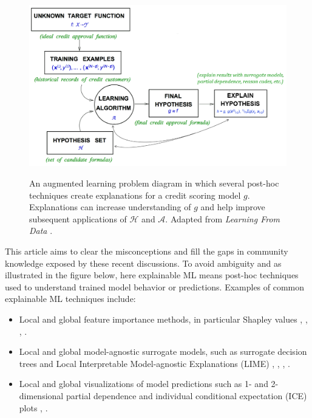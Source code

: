 \documentclass{article}
\begin{document}
\begin{figure}[htb]
	\begin{center}
		\includegraphics[scale=0.33]{img/figure_1.png}
		\label{fig:learning_problem}
		\caption{An augmented learning problem diagram in which several post-hoc techniques create explanations for a credit scoring model $g$. Explanations can increase understanding of $g$ and help improve subsequent applications of $\mathcal{H}$ and $\mathcal{A}$. Adapted from \textit{Learning From Data} \cite{lfd}.}
	\end{center}
\end{figure}	

This article aims to clear the misconceptions and fill the gaps in community knowledge exposed by these recent discussions. To avoid ambiguity and as illustrated in the figure below, here explainable ML means post-hoc techniques used to understand trained model behavior or predictions. Examples of common explainable ML techniques include:

\begin{itemize}
\item Local and global feature importance methods, in particular Shapley values \cite{shapley1988shapley}, \cite{keinan2004fair}, \cite{kononenko2010efficient}, \cite{shapley}.
\item Local and global model-agnostic surrogate models, such as surrogate decision trees and Local Interpretable Model-agnostic Explanations (LIME) \cite{dt_surrogate1}, \cite{dt_surrogate2}, \cite{lime-sup}, \cite{lime}. 
\item Local and global visualizations of model predictions such as 1- and 2-dimensional partial dependence and individual conditional expectation (ICE) plots \cite{esl}, \cite{ice_plots}.
\end{itemize}
\end{document}
